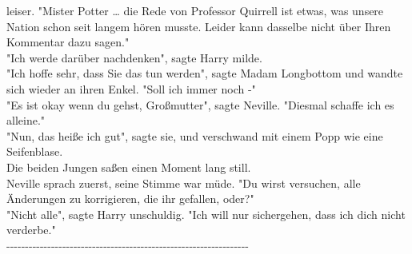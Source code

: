 {leiser. "Mister Potter … die Rede von Professor Quirrell ist etwas, was unsere Nation schon seit langem hören musste. Leider kann dasselbe nicht über Ihren Kommentar dazu sagen."\\ "Ich werde darüber nachdenken", sagte Harry milde.\\ "Ich hoffe sehr, dass Sie das tun werden", sagte Madam Longbottom und wandte sich wieder an ihren Enkel. "Soll ich immer noch -"\\ "Es ist okay wenn du gehst, Großmutter", sagte Neville. "Diesmal schaffe ich es alleine."\\ "Nun, das heiße ich gut", sagte sie, und verschwand mit einem Popp wie eine Seifenblase.\\ Die beiden Jungen saßen einen Moment lang still.\\ Neville sprach zuerst, seine Stimme war müde. "Du wirst versuchen, alle Änderungen zu korrigieren, die ihr gefallen, oder?"\\ "Nicht alle", sagte Harry unschuldig. "Ich will nur sichergehen, dass ich dich nicht verderbe."\\ -\/-\/-\/-\/-\/-\/-\/-\/-\/-\/-\/-\/-\/-\/-\/-\/-\/-\/-\/-\/-\/-\/-\/-\/-\/-\/-\/-\/-\/-\/-\/-\/-\/-\/-\/-\/-\/-\/-\/-\/-\/-\/-\/-\/-\/-\/-\/-\/-\/-\/-\/-\/-\/-\/-\/-\/-\/-\/-\/-\/-\/-\/-\/-\/-

}
